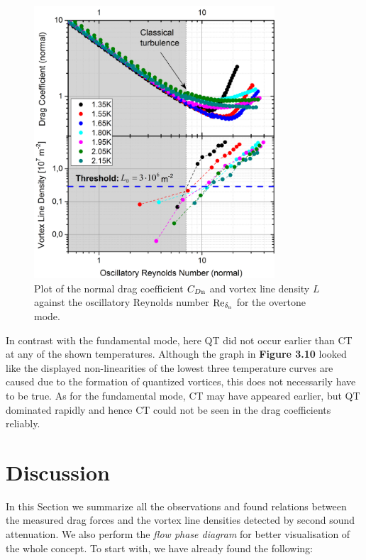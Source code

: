 \newpage

\begin{figure}[h!]
	\centering
	\includegraphics[width=0.8\textwidth]{graphs/Merged_C+L_Ren_over}
	\caption{Plot of the normal drag coefficient $ C_{D\mathrm{n}} $ and vortex line density $ L $ against the oscillatory Reynolds number $ \text{Re}_{\delta_{\mathrm{n}}} $ for the overtone mode.}
\end{figure}

In contrast with the fundamental mode, here QT did not occur earlier than CT at any of the shown temperatures. Although the graph in {\sffamily\textbf{Figure 3.10}} looked like the displayed non-linearities of the lowest three temperature curves are caused due to the formation of quantized vortices, this does not necessarily have to be true. As for the fundamental mode, CT may have appeared earlier, but QT dominated rapidly and hence CT could not be seen in the drag coefficients reliably.

\newpage

\section{Discussion}

In this Section we summarize all the observations and found relations between the measured drag forces and the vortex line densities detected by second sound attenuation. We also perform the \textit{flow phase diagram} for better visualisation of the whole concept. To start with, we have already found the following:

